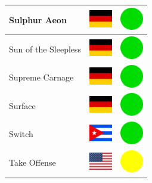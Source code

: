 \documentclass[12pt, a4paper, twoside]{report}
\begin{document}
\begin{center}
\begin{longtable}{|p{5cm}|p{2cm}|p{2cm}|}
Sulphur Aeon & \includegraphics[width=1cm]{4x3/de} & \includegraphics[width=1cm]{likes/y} \\ \hline
Sun of the Sleepless & \includegraphics[width=1cm]{4x3/de} & \includegraphics[width=1cm]{likes/y} \\ \hline
Supreme Carnage & \includegraphics[width=1cm]{4x3/de} & \includegraphics[width=1cm]{likes/y} \\ \hline
Surface & \includegraphics[width=1cm]{4x3/de} & \includegraphics[width=1cm]{likes/y} \\ \hline
Switch & \includegraphics[width=1cm]{4x3/cu} & \includegraphics[width=1cm]{likes/y} \\ \hline
Take Offense & \includegraphics[width=1cm]{4x3/us} & \includegraphics[width=1cm]{likes/m} \\ \hline

\end{longtable}
\end{center}
\end{document}
